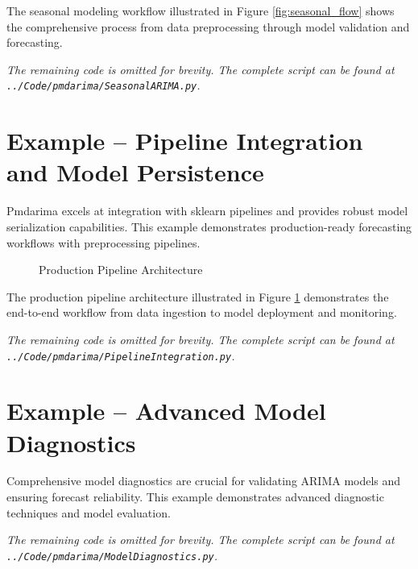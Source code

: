 The seasonal modeling workflow illustrated in Figure \ref{fig:seasonal_flow} shows the comprehensive process from data preprocessing through model validation and forecasting.


\noindent\textit{The remaining code is omitted for brevity. The complete script can be found at \texttt{../Code/pmdarima/SeasonalARIMA.py}.}

\section{Example -- Pipeline Integration and Model Persistence}
\label{sec:pipeline_example}

Pmdarima excels at integration with sklearn pipelines and provides robust model serialization capabilities. This example demonstrates production-ready forecasting workflows with preprocessing pipelines.

\begin{figure}[htbp]
	\centering
    
	\caption{Production Pipeline Architecture}
	\label{fig:pipelineDeployment}
\end{figure}

The production pipeline architecture illustrated in Figure \ref{fig:pipelineDeployment} demonstrates the end-to-end workflow from data ingestion to model deployment and monitoring.


\noindent\textit{The remaining code is omitted for brevity. The complete script can be found at \texttt{../Code/pmdarima/PipelineIntegration.py}.}

\section{Example -- Advanced Model Diagnostics}
\label{sec:diagnostics_example}

Comprehensive model diagnostics are crucial for validating ARIMA models and ensuring forecast reliability. This example demonstrates advanced diagnostic techniques and model evaluation.


\noindent\textit{The remaining code is omitted for brevity. The complete script can be found at \texttt{../Code/pmdarima/ModelDiagnostics.py}.}

